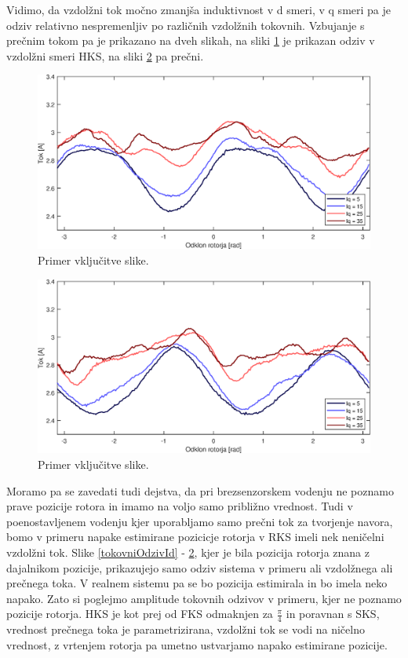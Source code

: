 \documentclass[a4paper,twoside,openright,12pt,slovene]{book}
\begin{document}
Vidimo, da vzdolžni tok močno zmanjša induktivnost v d smeri, v q smeri pa je odziv relativno nespremenljiv po različnih vzdolžnih tokovnih.
Vzbujanje s prečnim tokom pa je prikazano na dveh slikah, na sliki \ref{tokovniOdzivIq_IdAmp} je prikazan odziv v vzdolžni smeri HKS, na sliki \ref{tokovniOdzivIq_IqAmp} pa prečni. 

\begin{figure}[!htbp]
    \centering
    \includegraphics[width=1\columnwidth]{Slike/tokovniOdzivIq_IdAmp.eps}
    \caption{\label{tokovniOdzivIq_IdAmp} Primer vključitve slike.}
\end{figure}

\begin{figure}[!htbp]
    \centering
    \includegraphics[width=1\columnwidth]{Slike/tokovniOdzivIq_IqAmp.eps}
    \caption{\label{tokovniOdzivIq_IqAmp} Primer vključitve slike.}
\end{figure}
 
Moramo pa se zavedati tudi dejstva, da pri brezsenzorskem vodenju ne poznamo prave pozicije rotora in imamo na voljo samo približno vrednost. Tudi v poenostavljenem vodenju kjer uporabljamo samo
prečni tok za tvorjenje navora, bomo v primeru napake estimirane pozicicje rotorja v RKS imeli nek neničelni vzdolžni tok. Slike \ref{tokovniOdzivId} - \ref{tokovniOdzivIq_IqAmp}, kjer je bila
pozicija rotorja znana z dajalnikom pozicije, prikazujejo samo odziv sistema v primeru ali vzdolžnega ali prečnega toka. V realnem sistemu pa se bo pozicija estimirala in bo imela neko napako. Zato si
poglejmo amplitude tokovnih odzivov v primeru, kjer ne poznamo pozicije rotorja. HKS je kot prej od FKS odmaknjen za $\frac{\pi}{4}$ in poravnan s SKS, vrednost prečnega toka je parametrizirana, vzdolžni tok se vodi na
ničelno vrednost, z vrtenjem rotorja pa umetno ustvarjamo napako estimirane pozicije.
\end{document}
